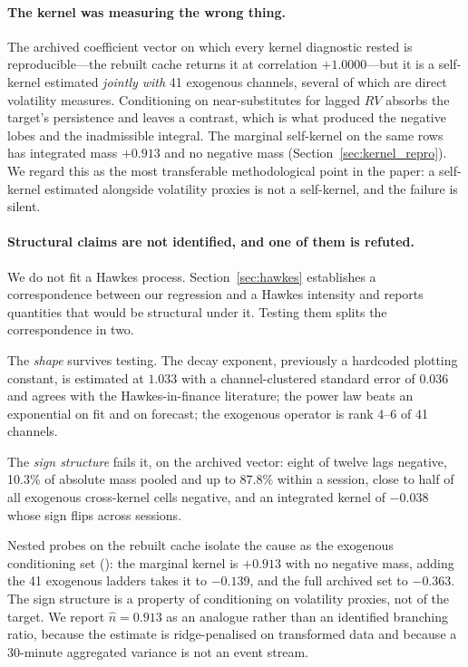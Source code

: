 \paragraph{The kernel was measuring the wrong thing.} The archived
coefficient vector on which every kernel diagnostic rested is reproducible---the
rebuilt cache returns it at correlation $+1.0000$---but it is a self-kernel
estimated \emph{jointly with} 41 exogenous channels, several of which are
direct volatility measures. Conditioning on near-substitutes for lagged $RV$
absorbs the target's persistence and leaves a contrast, which is what produced
the negative lobes and the inadmissible integral. The marginal self-kernel on
the same rows has integrated mass $+0.913$ and no negative mass
(Section~\ref{sec:kernel_repro}). We regard this as the most transferable
methodological point in the paper: a self-kernel estimated alongside volatility
proxies is not a self-kernel, and the failure is silent.

\paragraph{Structural claims are not identified, and one of them is refuted.}
We do not fit a Hawkes process. Section~\ref{sec:hawkes} establishes a
correspondence between our regression and a Hawkes intensity and reports
quantities that would be structural under it. Testing them splits the
correspondence in two.

The \emph{shape} survives testing. The decay exponent, previously a hardcoded
plotting constant, is estimated at $1.033$ with a channel-clustered standard
error of $0.036$ and agrees with the Hawkes-in-finance literature; the power
law beats an exponential on fit and on forecast; the exogenous operator is
rank 4--6 of 41 channels.

The \emph{sign structure} fails it, on the archived vector: eight of twelve
lags negative, 10.3\% of absolute mass pooled and up to 87.8\% within a
session, close to half of all exogenous cross-kernel cells negative, and an
integrated kernel of $-0.038$ whose sign flips across sessions.

Nested probes on the rebuilt cache isolate the cause as the exogenous
conditioning set (): the marginal kernel is
$+0.913$ with no negative mass, adding the 41 exogenous ladders takes it to
$-0.139$, and the full archived set to $-0.363$. The sign structure is a
property of conditioning on volatility proxies, not of the target. We report
$\hat n = 0.913$ as an analogue rather than an identified branching ratio,
because the estimate is ridge-penalised on transformed data and because a
30-minute aggregated variance is not an event stream.

